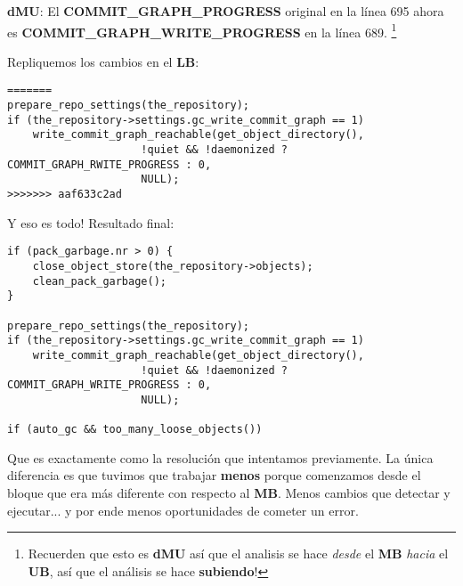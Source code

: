 {\bf dMU}: El {\bf COMMIT\_GRAPH\_PROGRESS} original en la línea 695 ahora es {\bf COMMIT\_GRAPH\_WRITE\_PROGRESS} en la línea 689.
\footnote{Recuerden que esto es {\bf dMU} así que el analisis se hace {\it desde} el {\bf MB} {\it hacia} el {\bf UB}, así que el
análisis se hace {\bf subiendo}!}

Repliquemos los cambios en el {\bf LB}:

\begin{lstlisting}[style=c_style,
	basicstyle=\tiny,
	firstnumber=698,
	caption={\bf Ejemplo 5} - Paso 1]
=======
prepare_repo_settings(the_repository);
if (the_repository->settings.gc_write_commit_graph == 1)
	write_commit_graph_reachable(get_object_directory(),
				     !quiet && !daemonized ? COMMIT_GRAPH_RWITE_PROGRESS : 0,
				     NULL);
>>>>>>> aaf633c2ad
\end{lstlisting}

Y eso es todo! Resultado final:
\begin{lstlisting}[style=c_style,
	basicstyle=\tiny,
	firstnumber=681,
	caption={\bf Ejemplo 5} - Resultado final]
if (pack_garbage.nr > 0) {
	close_object_store(the_repository->objects);
	clean_pack_garbage();
}

prepare_repo_settings(the_repository);
if (the_repository->settings.gc_write_commit_graph == 1)
	write_commit_graph_reachable(get_object_directory(),
				     !quiet && !daemonized ? COMMIT_GRAPH_WRITE_PROGRESS : 0,
				     NULL);

if (auto_gc && too_many_loose_objects())
\end{lstlisting}

Que es exactamente como la resolución que intentamos previamente. La única diferencia es que tuvimos que trabajar {\bf menos}
porque comenzamos desde el bloque que era más diferente con respecto al {\bf MB}. Menos cambios que detectar y ejecutar... y
por ende menos oportunidades de cometer un error.

